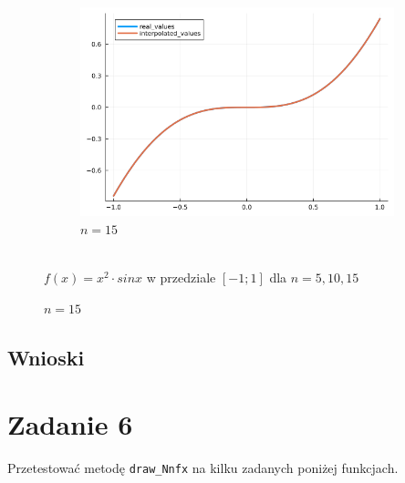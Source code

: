 \documentclass{article}
\def\v{0.47}
\begin{document}
\begin{figure}[H]
\begin{subfigure}[b]{\v\linewidth}
			\includegraphics[width=\linewidth]{graphs/zad5.b.15.png}
			\caption{$n = 15$}
		\end{subfigure}
	\\{$f(x) = x^2 \cdot sin x$ w przedziale $[-1;1]$ dla $n = 5,10,15$}
	\end{figure}
\subsection*{Wnioski}

\section*{Zadanie 6}
	Przetestować metodę \texttt{draw\_Nnfx} na kilku zadanych poniżej funkcjach.
\end{document}
